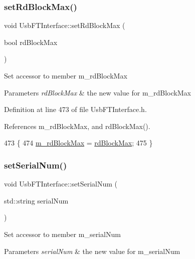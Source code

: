 \subsubsection{\texorpdfstring{set\+Rd\+Block\+Max()}{setRdBlockMax()}}
{\footnotesize\ttfamily void Usb\+F\+T\+Interface\+::set\+Rd\+Block\+Max (\begin{DoxyParamCaption}\item[{bool}]{rd\+Block\+Max }\end{DoxyParamCaption})\hspace{0.3cm}{\ttfamily [inline]}}

Set accessor to member m\+\_\+rd\+Block\+Max 
\begin{DoxyParams}{Parameters}
{\em rd\+Block\+Max} & the new value for m\+\_\+rd\+Block\+Max \\
\hline
\end{DoxyParams}


Definition at line 473 of file Usb\+F\+T\+Interface.\+h.



References m\+\_\+rd\+Block\+Max, and rd\+Block\+Max().


\begin{DoxyCode}
473                                        \{
474     \hyperlink{classUsbFTInterface_a0f5050f1ed93392c8e5e4acaf7b75e1c}{m\_rdBlockMax} = \hyperlink{classUsbFTInterface_a9f213ab1804e61af476bbdd3ade2d053}{rdBlockMax};
475   \}
\end{DoxyCode}
\mbox{\label{classUsbFTInterface_aaabe44c3b717a98e7571de296085c3a4}} 
\subsubsection{\texorpdfstring{set\+Serial\+Num()}{setSerialNum()}}
{\footnotesize\ttfamily void Usb\+F\+T\+Interface\+::set\+Serial\+Num (\begin{DoxyParamCaption}\item[{std\+::string}]{serial\+Num }\end{DoxyParamCaption})\hspace{0.3cm}{\ttfamily [inline]}}

Set accessor to member m\+\_\+serial\+Num 
\begin{DoxyParams}{Parameters}
{\em serial\+Num} & the new value for m\+\_\+serial\+Num \\
\hline
\end{DoxyParams}



